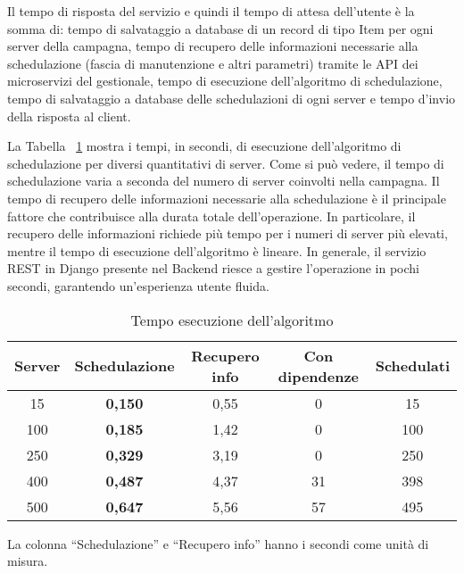 Il tempo di risposta del servizio e quindi il tempo di attesa dell’utente è 
la somma di: tempo di salvataggio a database di un record di tipo Item per 
ogni server della campagna, tempo di recupero delle informazioni necessarie 
alla schedulazione (fascia di manutenzione e altri parametri) tramite le API 
dei microservizi del gestionale, tempo di esecuzione dell'algoritmo di 
schedulazione, tempo di salvataggio a database delle schedulazioni di ogni 
server e tempo d'invio della risposta al client.

La Tabella ~\ref{tab:algo-exec} mostra i tempi, in secondi, di esecuzione 
dell'algoritmo di schedulazione per diversi quantitativi di server. Come si 
può vedere, il tempo di schedulazione varia a seconda del numero di server 
coinvolti nella campagna. Il tempo di recupero delle informazioni necessarie 
alla schedulazione è il principale fattore che contribuisce alla durata 
totale dell'operazione. In particolare, 
il recupero delle informazioni richiede più tempo per i numeri di server più 
elevati, mentre il tempo di esecuzione dell'algoritmo è lineare. 
In generale, il servizio REST in Django presente nel Backend riesce a gestire 
l'operazione in pochi secondi, garantendo un'esperienza utente fluida.\\

\begin {table}[H]
\begin{center}
\begin{tabular}{|c|c|c|c|c|}
  
  \hline
  \rowcolor[gray]{.66}
  \textbf{Server} & \textbf{Schedulazione} & \textbf{Recupero info} & \textbf{Con dipendenze} & \textbf{Schedulati}\\
  
  \hline
  \rowcolor[gray]{.87}15 & \textbf{0,150} & 0,55 & 0 & 15 \\
  \rowcolor[gray]{.95}100 & \textbf{0,185} & 1,42 & 0 & 100 \\
  \rowcolor[gray]{.87}250 & \textbf{0,329} & 3,19 & 0 & 250 \\
  \rowcolor[gray]{.95}400 & \textbf{0,487} & 4,37 & 31 & 398 \\
  \rowcolor[gray]{.87}500 & \textbf{0,647} & 5,56 & 57 & 495 \\
  \hline
\end{tabular} 
\caption {Tempo esecuzione dell'algoritmo}
\label{tab:algo-exec}
La colonna “Schedulazione” e “Recupero info” hanno i secondi come unità di misura.
\end{center}
\end{table}

